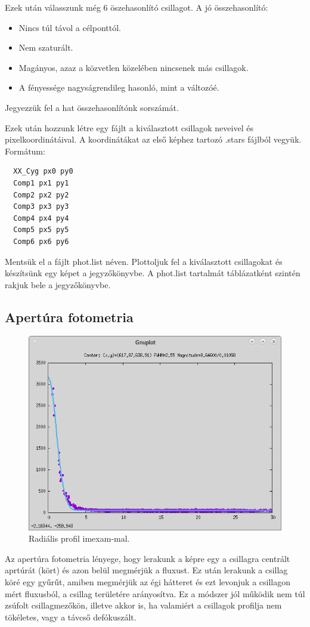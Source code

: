 \documentclass{article}
\begin{document}
Ezek után válasszunk még 6 öszehasonlító csillagot.
A jó összehasonlító:
\begin{itemize}
  \item Nincs túl távol a célponttól.
  \item Nem szaturált.
  \item Magányos, azaz a közvetlen közelében nincsenek más csillagok.
  \item A fényessége nagyságrendileg hasonló, mint a változóé.
\end{itemize}

Jegyezzük fel a hat összehasonlítónk sorszámát.

Ezek után hozzunk létre egy fájlt a kiválasztott csillagok neveivel és
pixelkoordinátáival. A koordinátákat az első képhez tartozó .stars fájlból
vegyük. Formátum:

\begin{verbatim}
  XX_Cyg px0 py0
  Comp1 px1 py1
  Comp2 px2 py2
  Comp3 px3 py3
  Comp4 px4 py4
  Comp5 px5 py5
  Comp6 px6 py6
\end{verbatim}

Mentsük el a fájlt phot.list néven. Plottoljuk fel a kiválasztott csillagokat
és készítsünk egy képet a jegyzőkönyvbe. A phot.list tartalmát táblázatként
szintén rakjuk bele a jegyzőkönyvbe.

\subsection{Apertúra fotometria}


\begin{figure}[ht!]
    \centering
    \includegraphics[width=0.7\linewidth]{pics/radialprofil.png}
    \caption{Radiális profil imexam-mal.}
    \label{radialp}
\end{figure}

Az apertúra fotometria lényege, hogy lerakunk a képre egy a csillagra centrált
aprtúrát (kört) és azon belül megmérjük a fluxust. Ez után lerakunk a csillag
köré egy gyűrűt, amiben megmérjük az égi hátteret és ezt levonjuk a csillagon
mért fluxusból, a csillag területére arányosítva.
Ez a módszer jól működik nem túl zsúfolt csillagmezőkön, illetve akkor is, ha
valamiért a csillagok profilja nem tökéletes, vagy a távcső defókuszált.
\end{document}
